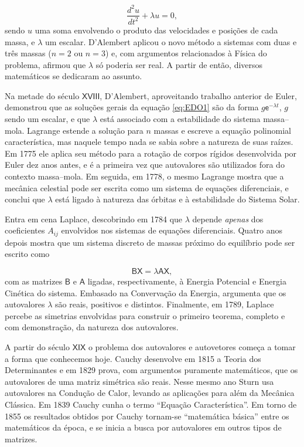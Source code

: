 \begin{equation}\label{eq:EDO1}
	\frac{d^2u}{dt^2} + \lambda u = 0,
\end{equation}
sendo $u$ uma soma envolvendo o produto das velocidades e posições de cada massa, e $\lambda$ um escalar. D'Alembert aplicou o novo método a sistemas com duas e três massas ($n = 2$ ou $n = 3$) e, com argumentos relacionados à Física do problema, afirmou que $\lambda$ só poderia ser real. A partir de então, diversos matemáticos se dedicaram ao assunto.

	Na metade do século $\mathsf{XVIII}$, D'Alembert, aproveitando trabalho anterior de Euler, demonstrou que as soluções gerais da equação \ref{eq:EDO1} são da forma $g\mathsf{e}^{-\lambda t}$, $g$ sendo um escalar, e que $\lambda$ está associado com a estabilidade do sistema massa--mola. Lagrange estende a solução para $n$ massas e escreve a equação polinomial característica, mas naquele tempo nada se sabia sobre a natureza de suas raízes. Em 1775 ele aplica seu método para a rotação de corpos rígidos desenvolvida por Euler dez anos antes, e é a primeira vez que autovalores são utilizados fora do contexto massa--mola. Em seguida, em 1778, o mesmo Lagrange mostra que a mecânica celestial pode ser escrita como um sistema de equações diferenciais, e conclui que $\lambda$ está ligado à natureza das órbitas e à estabilidade do Sistema Solar.
	
	Entra em cena Laplace, descobrindo em 1784 que $\lambda$ depende \emph{apenas} dos coeficientes $A_{ij}$ envolvidos nos sistemas de equações diferenciais. Quatro anos depois mostra que um sistema discreto de massas próximo do equilíbrio pode ser escrito como 
	
	\begin{equation}
		\mathsf{B}\mathsf{X} = \lambda \mathsf{A}\mathsf{X},
	\end{equation}
	com as matrizes $\mathsf{B}$ e $\mathsf{A}$ ligadas, respectivamente, à Energia Potencial e Energia Cinética do sistema. Embasado na Convervação da Energia, argumenta que os autovalores $\lambda$ são reais, positivos e distintos. Finalmente, em 1789, Laplace percebe as simetrias envolvidas para construir o primeiro teorema, completo e com demonstração, da natureza dos autovalores.
	
	A partir do século $\mathsf{XIX}$ o problema dos autovalores e autovetores começa a tomar a forma que conhecemos hoje. Cauchy desenvolve em 1815 a Teoria dos Determinantes e em 1829 prova, com argumentos puramente matemáticos, que os autovalores de uma matriz simétrica são reais. Nesse mesmo ano Sturn usa autovalores na Condução de Calor, levando as aplicações para além da Mecânica Clássica. Em 1839 Cauchy cunha o termo ``Equação Característica''. Em torno de 1855 os resultados obtidos por Cauchy tornam-se ``matemática básica'' entre os matemáticos da época, e se inicia a busca por autovalores em outros tipos de matrizes. 
	

